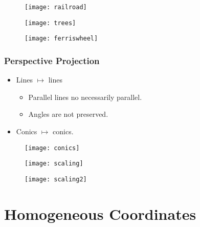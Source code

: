 \begin{frame}
\begin{figure}[!h]
\centering
\texttt{[image: railroad]}
\end{figure}
\end{frame}

\begin{frame}
\begin{figure}[!h]
\centering
\texttt{[image: trees]}
\end{figure}
\end{frame}

\begin{frame}
\begin{figure}[!h]
\centering
\texttt{[image: ferriswheel]}
\end{figure}
\end{frame}

\begin{frame}
\frametitle{Perspective Projection}
\begin{itemize}
\item Lines $\mapsto$ lines
\begin{itemize}
\item Parallel lines no necessarily parallel.
\item Angles are not preserved.
\end{itemize}
\item Conics $\mapsto$ conics.
\end{itemize}
\begin{figure}[!h]
\centering
\texttt{[image: conics]}
\end{figure}
\end{frame}

\begin{frame}
\begin{figure}[!h]
\centering
\texttt{[image: scaling]}
\end{figure}
\end{frame}

\begin{frame}
\begin{figure}[!h]
\centering
\texttt{[image: scaling2]}
\end{figure}
\end{frame}

\section{Homogeneous Coordinates}

